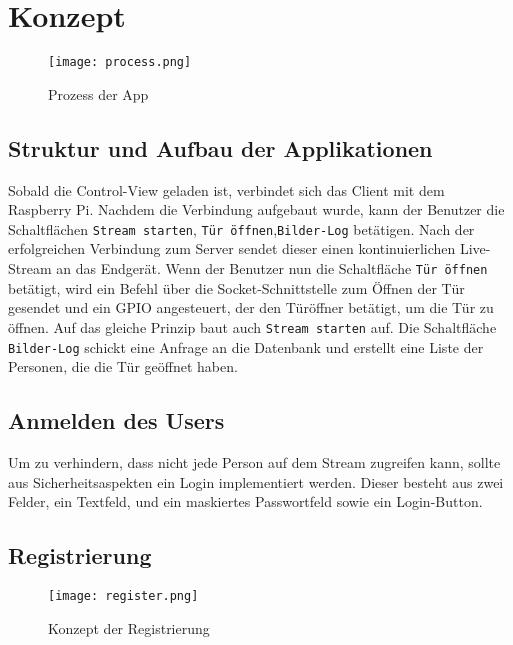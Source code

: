 \section{Konzept}

\begin{figure}[h]
  \begin{center}
    \texttt{[image: process.png]}
  		  \caption{Prozess der App}
     \label{fig.Prozess}
  \end{center}
\end{figure}

\subsection{Struktur und Aufbau der Applikationen}

Sobald die Control-View geladen ist, verbindet sich das Client mit dem Raspberry Pi. Nachdem die Verbindung aufgebaut wurde, kann der Benutzer die Schaltflächen \texttt{Stream starten}, \texttt{Tür öffnen},\texttt{Bilder-Log} betätigen. Nach der erfolgreichen Verbindung zum Server sendet dieser einen kontinuierlichen Live-Stream an das Endgerät. Wenn der Benutzer nun die Schaltfläche \texttt{Tür öffnen} betätigt, wird ein Befehl über die Socket-Schnittstelle zum Öffnen der Tür gesendet und ein GPIO angesteuert, der den Türöffner betätigt, um die Tür zu öffnen. Auf das gleiche Prinzip baut auch \texttt{Stream starten} auf. Die Schaltfläche \texttt{Bilder-Log} schickt eine Anfrage an die Datenbank und erstellt eine Liste der Personen,  die die Tür geöffnet haben.


\subsection{Anmelden des Users}
Um zu verhindern, dass nicht jede Person auf dem Stream zugreifen kann, sollte aus Sicherheitsaspekten ein Login implementiert werden. Dieser besteht aus zwei Felder, ein Textfeld, und ein maskiertes Passwortfeld sowie ein Login-Button.

\subsection{Registrierung}
\begin{figure}[h]
  \begin{center}
    \texttt{[image: register.png]}
  		  \caption{Konzept der Registrierung}
     \label{fig.Prozess}
  \end{center}
\end{figure}

